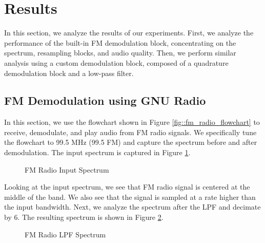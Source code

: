 \documentclass{article}
\begin{document}
\section{Results}

In this section, we analyze the results of our experiments. First, we analyze the performance of the built-in FM demodulation block, concentrating on the spectrum, resampling blocks, and audio quality. Then, we perform similar analysis using a custom demodulation block, composed of a quadrature demodulation block and a low-pass filter.

\subsection{FM Demodulation using GNU Radio}

In this section, we use the flowchart shown in Figure \ref{fig::fm_radio_flowchart} to receive, demodulate, and play audio from FM radio signals. We specifically tune the flowchart to 99.5 MHz (99.5 FM) and capture the spectrum before and after demodulation. The input spectrum is captured in Figure \ref{fig::fm_radio_input_spectrum}.

\begin{figure}[H]
	\centerline{}
	\caption{FM Radio Input Spectrum}
	\label{fig::fm_radio_input_spectrum}
\end{figure}

\noindent Looking at the input spectrum, we see that FM radio signal is centered at the middle of the band. We also see that the signal is sampled at a rate higher than the input bandwidth. Next, we analyze the spectrum after the LPF and decimate by 6. The resulting spectrum is shown in Figure \ref{fig::fm_radio_lpf_spectrum}.

\begin{figure}[H]
	\centerline{}
	\caption{FM Radio LPF Spectrum}
	\label{fig::fm_radio_lpf_spectrum}
\end{figure}
\end{document}
